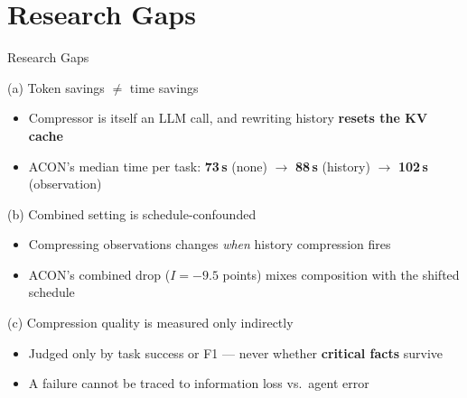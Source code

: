 \documentclass[aspectratio=169,10pt]{beamer}
\begin{document}
\section{Research Gaps}
\begin{frame}{Research Gaps}
\begin{alertblock}{(a) Token savings $\neq$ time savings}
\footnotesize
\begin{itemize}
  \item Compressor is itself an LLM call, and rewriting history \textbf{resets the KV cache}
  \item ACON's median time per task: \textbf{73\,s} (none) $\to$ \textbf{88\,s} (history) $\to$ \textbf{102\,s} (observation)
\end{itemize}
\end{alertblock}
\vspace{0.15cm}
\begin{alertblock}{(b) Combined setting is schedule-confounded}
\footnotesize
\begin{itemize}
  \item Compressing observations changes \emph{when} history compression fires
  \item ACON's combined drop ($I=\mathbf{-9.5}$ points) mixes composition with the shifted schedule
\end{itemize}
\end{alertblock}
\vspace{0.15cm}
\begin{alertblock}{(c) Compression quality is measured only indirectly}
\footnotesize
\begin{itemize}
  \item Judged only by task success or F1 --- never whether \textbf{critical facts} survive
  \item A failure cannot be traced to information loss vs.\ agent error
\end{itemize}
\end{alertblock}
\end{frame}

\end{document}
